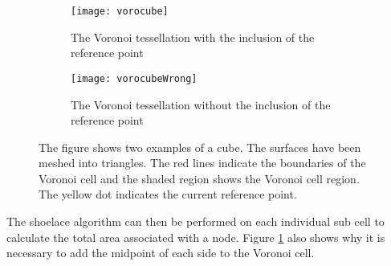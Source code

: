\begin{figure}[h]
    \centering
    \begin{subfigure}[b]{0.45\textwidth}
        \centering
        \texttt{[image: vorocube]}
        \caption{The Voronoi tessellation with the inclusion of the reference point}
    \end{subfigure}
    \hfill
    \begin{subfigure}[b]{0.45\textwidth}
        \centering
        \texttt{[image: vorocubeWrong]}
        \caption{The Voronoi tessellation without the inclusion of the reference point}
    \end{subfigure}
    \caption{The figure shows two examples of a cube. The surfaces have been meshed into triangles. The red lines indicate the boundaries of the Voronoi cell and the shaded region shows the Voronoi cell region. The yellow dot indicates the current reference point.}
    \label{fig:voroComp}
\end{figure}
The shoelace algorithm can then be performed on each individual sub cell to calculate the total area associated with a node. Figure \ref{fig:voroComp} also shows why it is necessary to add the midpoint of each side to the Voronoi cell.
